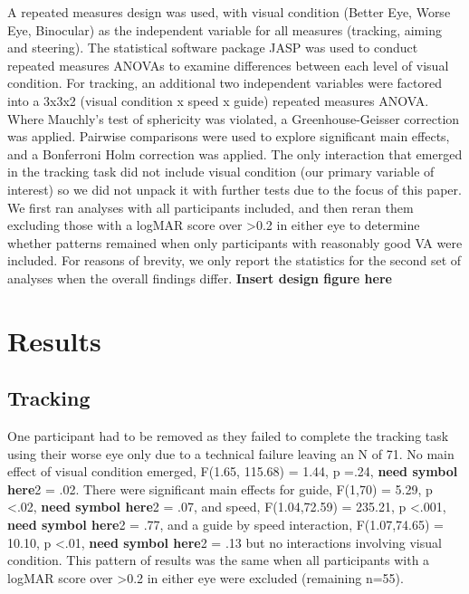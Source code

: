\documentclass[
  english,
  man,floatsintext]{apa6}
\begin{document}
A repeated measures design was used, with visual condition (Better Eye, Worse Eye, Binocular) as the independent variable for all measures (tracking, aiming and steering).
The statistical software package JASP was used to conduct repeated measures ANOVAs to examine differences between each level of visual condition.
For tracking, an additional two independent variables were factored into a 3x3x2 (visual condition x speed x guide) repeated measures ANOVA.
Where Mauchly's test of sphericity was violated, a Greenhouse-Geisser correction was applied.
Pairwise comparisons were used to explore significant main effects, and a Bonferroni Holm correction was applied.
The only interaction that emerged in the tracking task did not include visual condition (our primary variable of interest) so we did not unpack it with further tests due to the focus of this paper.
We first ran analyses with all participants included, and then reran them excluding those with a logMAR score over \textgreater{}0.2 in either eye to determine whether patterns remained when only participants with reasonably good VA were included.
For reasons of brevity, we only report the statistics for the second set of analyses when the overall findings differ.
\textbf{Insert design figure here}

\hypertarget{results}{%
\section{Results}\label{results}}

\hypertarget{tracking}{%
\subsection{Tracking}\label{tracking}}

One participant had to be removed as they failed to complete the tracking task using their worse eye only due to a technical failure leaving an N of 71.
No main effect of visual condition emerged, F(1.65, 115.68) = 1.44, p =.24, \textbf{need symbol here}2 = .02.
There were significant main effects for guide, F(1,70) = 5.29, p \textless{}.02, \textbf{need symbol here}2 = .07, and speed, F(1.04,72.59) = 235.21, p \textless{}.001, \textbf{need symbol here}2 = .77, and a guide by speed interaction, F(1.07,74.65) = 10.10, p \textless{}.01, \textbf{need symbol here}2 = .13 but no interactions involving visual condition.
This pattern of results was the same when all participants with a logMAR score over \textgreater{}0.2 in either eye were excluded (remaining n=55).
\end{document}

